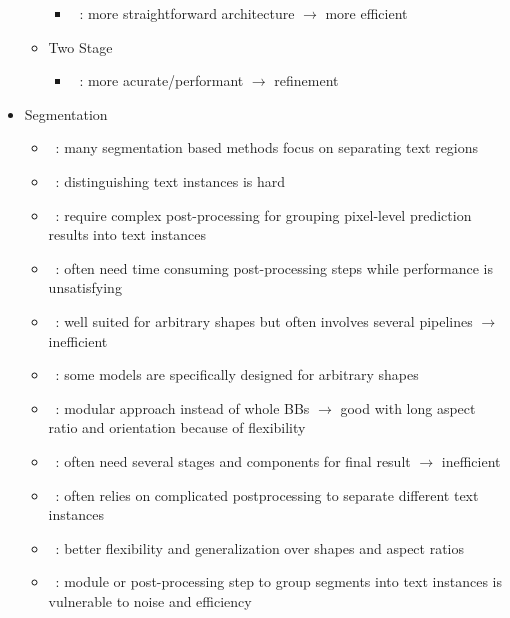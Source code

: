 \begin{itemize}
\begin{itemize}
                \begin{itemize}
                    \item~\cite{lu_mimicdet_2020}: more straightforward architecture
                        $\rightarrow$ more efficient
                \end{itemize}
            \item Two Stage
                \begin{itemize}
                    \item~\cite{lu_mimicdet_2020}: more acurate/performant $\rightarrow$ refinement
                \end{itemize}
        \end{itemize}
    \item Segmentation
        \begin{itemize}
            \item~\cite{xu_textfield_2019}: many segmentation based methods focus on separating
                text regions
            \item~\cite{wang_shape_2019}: distinguishing text instances is hard
            \item~\cite{liao_real-time_2019}: require complex post-processing for grouping
                pixel-level prediction results into text instances
            \item~\cite{xie_aggregation_2019}: often need time consuming post-processing steps
                while performance is unsatisfying
            \item~\cite{dai_fused_2018}: well suited for arbitrary shapes but often involves several
                pipelines $\rightarrow$ inefficient
            \item~\cite{ferrari_textsnake_2018}: some models are specifically designed for
                arbitrary shapes
            \item~\cite{shi_detecting_2017}: modular approach instead of whole \acp{BB}
                $\rightarrow$ good with long aspect ratio and orientation because of flexibility
            \item~\cite{dai_fused_2018}: often need several stages and components for final result
                $\rightarrow$ inefficient
            \item~\cite{qiao_text_2021}: often relies on complicated postprocessing to separate
                different text instances
            \item~\cite{long_scene_2021}: better flexibility and generalization over shapes and
                aspect ratios
            \item~\cite{long_scene_2021}: module or post-processing step to group segments
                into text instances is vulnerable to noise and efficiency
        \end{itemize}
\end{itemize}

